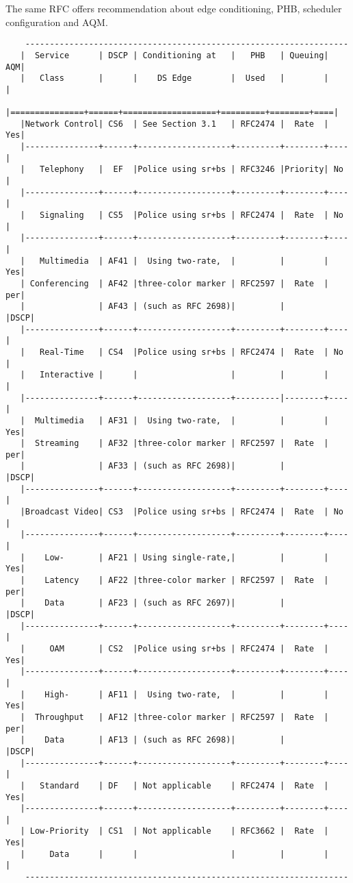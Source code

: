The same RFC offers recommendation about edge conditioning, PHB, scheduler configuration and AQM.

{\scriptsize
\begin{verbatim}
    ------------------------------------------------------------------
   |  Service      | DSCP | Conditioning at   |   PHB   | Queuing| AQM|
   |   Class       |      |    DS Edge        |  Used   |        |    |
   |===============+======+===================+=========+========+====|
   |Network Control| CS6  | See Section 3.1   | RFC2474 |  Rate  | Yes|
   |---------------+------+-------------------+---------+--------+----|
   |   Telephony   |  EF  |Police using sr+bs | RFC3246 |Priority| No |
   |---------------+------+-------------------+---------+--------+----|
   |   Signaling   | CS5  |Police using sr+bs | RFC2474 |  Rate  | No |
   |---------------+------+-------------------+---------+--------+----|
   |   Multimedia  | AF41 |  Using two-rate,  |         |        | Yes|
   | Conferencing  | AF42 |three-color marker | RFC2597 |  Rate  | per|
   |               | AF43 | (such as RFC 2698)|         |        |DSCP|
   |---------------+------+-------------------+---------+--------+----|
   |   Real-Time   | CS4  |Police using sr+bs | RFC2474 |  Rate  | No |
   |   Interactive |      |                   |         |        |    |
   |---------------+------+-------------------+---------|--------+----|
   |  Multimedia   | AF31 |  Using two-rate,  |         |        | Yes|
   |  Streaming    | AF32 |three-color marker | RFC2597 |  Rate  | per|
   |               | AF33 | (such as RFC 2698)|         |        |DSCP|
   |---------------+------+-------------------+---------+--------+----|
   |Broadcast Video| CS3  |Police using sr+bs | RFC2474 |  Rate  | No |
   |---------------+------+-------------------+---------+--------+----|
   |    Low-       | AF21 | Using single-rate,|         |        | Yes|
   |    Latency    | AF22 |three-color marker | RFC2597 |  Rate  | per|
   |    Data       | AF23 | (such as RFC 2697)|         |        |DSCP|
   |---------------+------+-------------------+---------+--------+----|
   |     OAM       | CS2  |Police using sr+bs | RFC2474 |  Rate  | Yes|
   |---------------+------+-------------------+---------+--------+----|
   |    High-      | AF11 |  Using two-rate,  |         |        | Yes|
   |  Throughput   | AF12 |three-color marker | RFC2597 |  Rate  | per|
   |    Data       | AF13 | (such as RFC 2698)|         |        |DSCP|
   |---------------+------+-------------------+---------+--------+----|
   |   Standard    | DF   | Not applicable    | RFC2474 |  Rate  | Yes|
   |---------------+------+-------------------+---------+--------+----|
   | Low-Priority  | CS1  | Not applicable    | RFC3662 |  Rate  | Yes|
   |     Data      |      |                   |         |        |    |
    ------------------------------------------------------------------
\end{verbatim}
}


